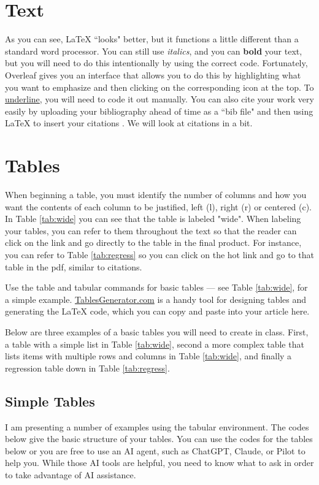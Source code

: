 \documentclass[10pt]{article}
\begin{document}
\section*{Text}
As you can see, \LaTeX{} ``looks" better, but it functions a little different than a standard word processor. You can still use \textit{italics}, and you can \textbf{bold} your text, but you will need to do this intentionally by using the correct code. Fortunately, Overleaf gives you an interface that allows you to do this by highlighting what you want to emphasize and then clicking on the corresponding icon at the top. To \uline{underline}, you will need to code it out manually. You can also cite your work very easily by uploading your bibliography ahead of time as a ``bib file" and then using \LaTeX{} to insert your citations \parencite{cadena_paradoxical_2023}. We will look at citations in a bit.

\section*{Tables}
When beginning a table, you must identify the number of columns and how you want the contents of each column to be justified, left (l), right (r) or centered (c). In Table \ref{tab:wide} you can see that the table is labeled "wide". When labeling your tables, you can refer to them throughout the text so that the reader can click on the link and go directly to the table in the final product. For instance, you can refer to Table \ref{tab:regress} so you can click on the hot link and go to that table in the pdf, similar to citations. 

Use the table and tabular commands for basic tables --- see Table \ref{tab:wide}, for a simple example. \href{http://tablesgenerator.com}{TablesGenerator.com} is a handy tool for designing tables and generating the LaTeX code, which you can copy and paste into your article here.

Below are three examples of a basic tables you will need to create in class. First, a table with a simple list in Table \ref{tab:wide}, second a more complex table that lists items with multiple rows and columns in Table \ref{tab:wide}, and finally a regression table down in Table \ref{tab:regress}. 

\subsection*{Simple Tables}

I am presenting a number of examples using the tabular environment. The codes below give the basic structure of your tables. You can use the codes for the tables below or you are free to use an AI agent, such as ChatGPT, Claude, or Pilot to help you. While those AI tools are helpful, you need to know what to ask in order to take advantage of AI assistance. 
\end{document}
